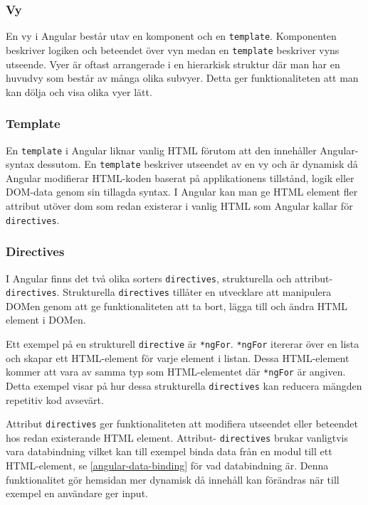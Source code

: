 
\subsubsection{Vy}
En vy i Angular består utav en komponent och en \texttt{template}. Komponenten beskriver logiken och beteendet över vyn medan en \texttt{template} beskriver vyns utseende. Vyer är oftast arrangerade i en hierarkisk struktur där man har en huvudvy som består av många olika subvyer. Detta ger funktionaliteten att man kan dölja och visa olika vyer lätt. 

\subsubsection{Template}
\label{angular-template}
En \texttt{template} i Angular liknar vanlig HTML förutom att den innehåller Angular-syntax dessutom. En \texttt{template} beskriver utseendet av en vy och är dynamisk då Angular modifierar HTML-koden baserat på applikationens tillstånd, logik eller DOM-data genom sin tillagda syntax.\cite{angular-components} I Angular kan man ge HTML element fler attribut utöver dom som redan existerar i vanlig HTML som Angular kallar för \texttt{directives}.

\subsubsection{Directives}
I Angular finns det två olika sorters \texttt{directives}, strukturella och attribut-\texttt{directives}. Strukturella \texttt{directives} tillåter en utvecklare att manipulera DOMen genom att ge funktionaliteten att ta bort, lägga till och ändra HTML element i DOMen. \cite{angular-services} 

Ett exempel på en strukturell \texttt{directive} är \texttt{*ngFor}. \texttt{*ngFor} itererar över en lista och skapar ett HTML-element för varje element i listan. Dessa HTML-element kommer att vara av samma typ som HTML-elementet där \texttt{*ngFor} är angiven. Detta exempel visar på hur dessa strukturella \texttt{directives} kan reducera mängden repetitiv kod avsevärt.

Attribut \texttt{directives} ger funktionaliteten att modifiera utseendet eller beteendet hos redan existerande HTML element. Attribut- \texttt{directives} brukar vanligtvis vara databindning vilket kan till exempel binda data från en modul till ett HTML-element, se \ref{angular-data-binding} för vad databindning är. Denna funktionalitet gör hemsidan mer dynamisk då innehåll kan förändras när till exempel en användare ger input.

